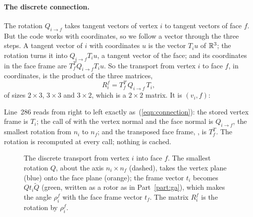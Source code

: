 \paragraph{The discrete connection.} The rotation $Q_{i \to f}$ takes tangent vectors of vertex $i$ to tangent vectors of face $f$. But the code works with coordinates, so we follow a vector through the three steps. A tangent vector of $i$ with coordinates $u$ is the vector $T_i u$ of $\mathbb{R}^3$; the rotation turns it into $Q_{i \to f} T_i u$, a tangent vector of the face; and its coordinates in the face frame are $T_f^T Q_{i \to f} T_i u$. So the transport from vertex $i$ to face $f$, in coordinates, is the product of the three matrices,
\begin{equation}
\label{eqn:connection}
R_i^f = T_f^T\, Q_{i \to f}\, T_i ,
\end{equation}
of sizes $2\times 3$, $3\times 3$ and $3 \times 2$, which is a $2\times 2$ matrix. It is $(v_i, f)$:

Line~286 reads from right to left exactly as~(\ref{eqn:connection}): the stored vertex frame  is $T_i$; the call of  with the vertex normal  and the face normal  is $Q_{i\to f}$, the smallest rotation from $n_i$ to $n_f$; and the transposed face frame, , is $T_f^T$. The rotation is recomputed at every call; nothing is cached.
\begin{figure}[t]
\centering
{}
\caption{The discrete transport from vertex $i$ into face $f$. The smallest rotation $Q$, about the axis $n_i \times n_f$ (dashed), takes the vertex plane (blue) onto the face plane (orange); the frame vector $t_i$ becomes $Q t_i \widetilde Q$ (green, written as a rotor as in Part~\ref{part:ga}), which makes the angle $\rho_i^f$ with the face frame vector $t_f$. The matrix $R_i^f$ is the rotation by $\rho_i^f$.}
\label{fig:rotor_transport}
\end{figure}

